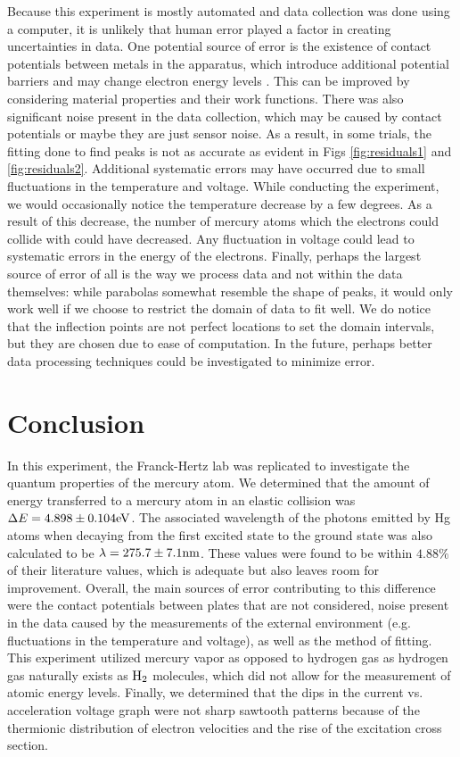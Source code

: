 \documentclass[12pt]{article}
\begin{document}
Because this experiment is mostly automated and data collection was done using a computer, it is unlikely that human error played a factor in creating uncertainties in data. One potential source of error is the existence of contact potentials between metals in the apparatus, which introduce additional potential barriers and may change electron energy levels \autocite{10.1063/1.1143230}. This can be improved by considering material properties and their work functions. There was also significant noise present in the data collection, which may be caused by contact potentials or maybe they are just sensor noise. As a result, in some trials, the fitting done to find peaks is not as accurate as evident in Figs \ref{fig:residuals1} and \ref{fig:residuals2}. Additional systematic errors may have occurred due to small fluctuations in the temperature and voltage. While conducting the experiment, we would occasionally notice the temperature decrease by a few degrees. As a result of this decrease, the number of mercury atoms which the electrons could collide with could have decreased. Any fluctuation in voltage could lead to systematic errors in the energy of the electrons. Finally, perhaps the largest source of error of all is the way we process data and not within the data themselves: while parabolas somewhat resemble the shape of peaks, it would only work well if we choose to restrict the domain of data to fit well. We do notice that the inflection points are not perfect locations to set the domain intervals, but they are chosen due to ease of computation. In the future, perhaps better data processing techniques could be investigated to minimize error.



\section{Conclusion}
In this experiment, the Franck-Hertz lab was replicated to investigate the quantum properties of the mercury atom. We determined that the amount of energy transferred to a mercury atom in an elastic collision was $\Delta E = 4.898 \pm 0.104 \rm {eV}$. The associated wavelength of the photons emitted by Hg atoms when decaying from the first excited state to the ground state was also calculated to be $\lambda = 275.7 \pm 7.1 \rm{nm}$. These values were found to be within $4.88\%$ of their literature values, which is adequate but also leaves room for improvement. Overall, the main sources of error contributing to this difference were the contact potentials between plates that are not considered, noise present in the data caused by the measurements of the external environment (e.g. fluctuations in the temperature and voltage), as well as the method of fitting. This experiment utilized mercury vapor as opposed to hydrogen gas as hydrogen gas naturally exists as $\rm H_2$ molecules, which did not allow for the measurement of atomic energy levels. Finally, we determined that the dips in the current vs. acceleration voltage graph were not sharp sawtooth patterns because of the thermionic distribution of electron velocities and the rise of the excitation cross section.
\end{document}
